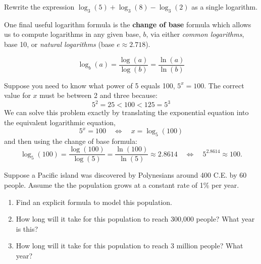 \newpage

\begin{exercise}
  Rewrite the expression \(\log_{3}(5)+\log_{3}(8)-\log_{3}(2)\) as a
  single logarithm.

\end{exercise}

One final useful logarithm formula is the \textbf{change of
  base} formula which allows us to compute logarithms in any given
base, \(b\), via either \emph{common logarithms}, \ie{} base 10, or
\emph{natural logarithms} (base \(e \approx 2.718\)).

\begin{equation}
  \label{eq:logarithmic-base-change}
  \boxed{\log_{b}(a)  = \frac{\log(a)}{\log(b)} = \frac{\ln(a)}{\ln(b)}}
\end{equation}
\begin{example}
  Suppose you need to know what power of 5 equals 100, \ie{}
  \(5^{x} = 100\). The correct value for \(x\) must be between 2 and three because:
  \[
    5^{2} = 25 < 100 < 125 = 5^{3}
  \]
  We can solve this problem exactly by translating the exponential
  equation into the equivalent logarithmic equation,
  \[
    5^{x} = 100 \quad \Leftrightarrow \quad x = \log_{5}(100)
  \]
  and then using the change of base formula:
  \[\log_{5}(100)
    = \frac{\log(100)}{\log(5)}
    = \frac{\ln(100)}{\ln(5)}
    \approx 2.8614  \quad \Leftrightarrow \quad
    5^{2.8614} \approx 100.\]
\end{example}

\begin{exercise}
  Suppose a Pacific island was discovered by Polynesians around 400
  C.E. by 60 people. Assume the the population grows at a constant
  rate of 1\% per year.

  \begin{enumerate}
  \item Find an explicit formula to model this population.
  \item How long will it take for this population to reach 300,000
    people? What year is this? 
  \item How long will it take for this population to reach 3 million
    people? What year? 
  \end{enumerate}
\end{exercise}

